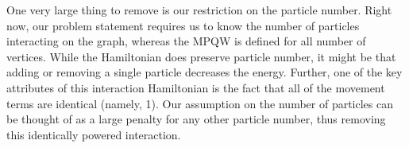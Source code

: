 \documentclass[../thesis-main/thesis-main]{subfiles}
\begin{document}
One very large thing to remove is our restriction on the particle number.  Right now, our problem statement requires us to know the number of particles interacting on the graph, whereas the MPQW is defined for all number of vertices. While the Hamiltonian does preserve particle number, it might be that adding or removing a single particle decreases the energy.  Further, one of the key attributes of this interaction Hamiltonian is the fact that all of the movement terms are identical (namely, 1).  Our assumption on the number of particles can be thought of as a large penalty for any other particle number, thus removing this identically powered interaction.

\biblio
\end{document}
